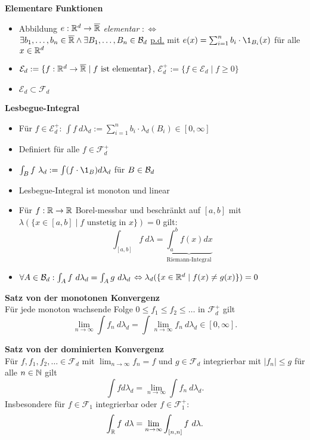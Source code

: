 \textbf{Elementare Funktionen}
\begin{itemize}

\item Abbildung $e:\mathbb{R}^d\to\overline{\mathbb{R}}$ \textit{elementar} $:\Leftrightarrow$\\
$\exists b_1,\ldots,b_n\in\overline{\mathbb{R}}\wedge\exists B_1,\ldots,B_n\in\mathcal{B}_{d}$
\underline{p.d.} mit $e(x)=\sum_{i=1}^{n} b_i\cdot \1_{B_i}(x)$ für alle $x\in\mathbb{R}^d$

\item $\mathcal{E}_d:=\{f:\mathbb{R}^d\to\overline{\mathbb{R}}\mid f \text{ ist elementar}\}$,
$\mathcal{E}_d^+:=\{f\in\mathcal{E}_d\mid f\geq 0\}$

\item $\mathcal{E}_d\subset\mathcal{F}_d$
\end{itemize}

\textbf{Lesbegue-Integral}
\begin{itemize}
\item Für $f\in\mathcal{E}_d^+$: 
$\int f~d\lambda_d:=\sum_{i=1}^{n} b_i\cdot\lambda_d(B_i)\in [0,\infty]$

\item Definiert für alle $f\in\mathcal{F}_d^+$

\item $\int_B f~\lambda_d:=\int (f\cdot \1_B)d\lambda_d$ für $B\in\mathcal{B}_{d}$

\item Lesbegue-Integral ist monoton und linear

\item Für $f:\mathbb{R}\to\mathbb{R}$ Borel-messbar und beschränkt auf $[a,b]$ mit
\mbox{$\lambda(\{x\in[a,b]\mid f \text{ unstetig in }x\})=0$} gilt:
\[
	\int_{[a,b]} f~d\lambda =
	\underbrace{\int_{a}^{b}f(x)dx}_{\text{Riemann-Integral}}
\]

\item $\forall A\in\mathcal{B}_{d}:\int_A f~d\lambda_d = \int_A g~d\lambda_d$
$\Leftrightarrow \lambda_d(\{x\in\mathbb{R}^d\mid f(x)\neq g(x)\})=0$
\end{itemize}

\textbf{Satz von der monotonen Konvergenz}\\
Für jede monoton wachsende Folge $0\leq f_1\leq f_2\leq\ldots$
in $\mathcal{F}_d^+$ gilt
\[\lim_{n\to\infty}\int f_n~d\lambda_d=
\int\lim_{n\to\infty} f_n~d\lambda_d\in [0,\infty].\]

\textbf{Satz von der dominierten Konvergenz}\\
Für $f,f_1,f_2,\ldots\in\mathcal{F}_d$ mit $\lim_{n\to\infty} f_n=f$ 
und $g\in\mathcal{F}_d$ integrierbar mit $|f_n|\leq g$ für alle $n\in\mathbb{N}$ gilt
\[
	\int fd\lambda_d=\lim_{n\to\infty} \int f_n~d\lambda_d.
\]
Insbesondere für $f\in\mathcal{F}_1$ integrierbar oder $f\in\mathcal{F}_1^+$:
\[
	\int_{\mathbb{R}} f~d\lambda=\lim_{n\to\infty} \int_{[n,n]} f~d\lambda.
\]


